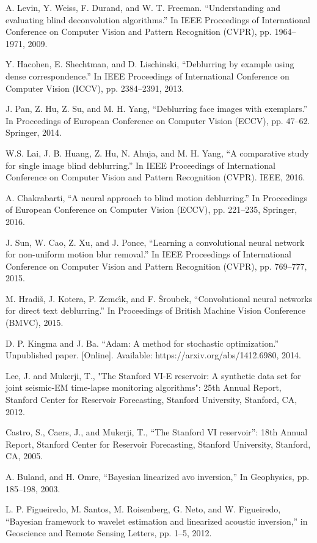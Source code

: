 \documentclass[journal]{IEEEtran}
\begin{document}
\begin{thebibliography}{1}
A. Levin, Y. Weiss, F. Durand, and W. T. Freeman. ``Understanding and evaluating blind deconvolution algorithms.'' In IEEE Proceedings of International Conference on Computer Vision and Pattern Recognition (CVPR), pp. 1964--1971, 2009.

Y. Hacohen, E. Shechtman, and D. Lischinski, ``Deblurring by example using dense correspondence.'' In IEEE Proceedings of International Conference on Computer Vision (ICCV), pp. 2384--2391, 2013.

J. Pan, Z. Hu, Z. Su, and M. H. Yang, ``Deblurring face images with exemplars.'' In Proceedings of European Conference on Computer Vision (ECCV), pp. 47--62. Springer, 2014.

W.S. Lai, J. B. Huang, Z. Hu, N. Ahuja, and M. H. Yang, ``A comparative study for single image blind deblurring.'' In IEEE Proceedings of International Conference on Computer Vision and Pattern Recognition (CVPR). IEEE, 2016.

A. Chakrabarti, ``A neural approach to blind motion deblurring.'' In Proceedings of European Conference on Computer Vision (ECCV), pp. 221--235, Springer, 2016.

J. Sun, W. Cao, Z. Xu, and J. Ponce, ``Learning a convolutional neural network for non-uniform motion blur removal.'' In IEEE Proceedings of International Conference on Computer Vision and Pattern Recognition (CVPR), pp. 769--777, 2015.

M. Hradiš, J. Kotera, P. Zemcı́k, and F. Šroubek, ``Convolutional neural networks for direct text deblurring.'' In Proceedings of British Machine Vision Conference (BMVC), 2015.

D. P. Kingma and J. Ba. “Adam: A method for stochastic optimization.” Unpublished paper. [Online]. Available: https://arxiv.org/abs/1412.6980, 2014.

Lee, J. and Mukerji, T., "The Stanford VI-E reservoir: A synthetic data set for joint seismic-EM time-lapse monitoring algorithms": 25th Annual Report, Stanford Center for Reservoir Forecasting, Stanford University, Stanford, CA, 2012.

Castro, S., Caers, J., and Mukerji, T., “The Stanford VI reservoir”: 18th Annual Report, Stanford Center for Reservoir Forecasting, Stanford University, Stanford, CA, 2005.

A. Buland,  and H. Omre, ``Bayesian linearized avo inversion,'' In Geophysics, pp. 185--198, 2003.

L. P. Figueiredo, M. Santos, M. Roisenberg, G. Neto, and W. Figueiredo, ``Bayesian framework to wavelet estimation and linearized acoustic inversion,'' in Geoscience and Remote Sensing Letters, pp. 1--5, 2012.

\end{thebibliography}
\end{document}
